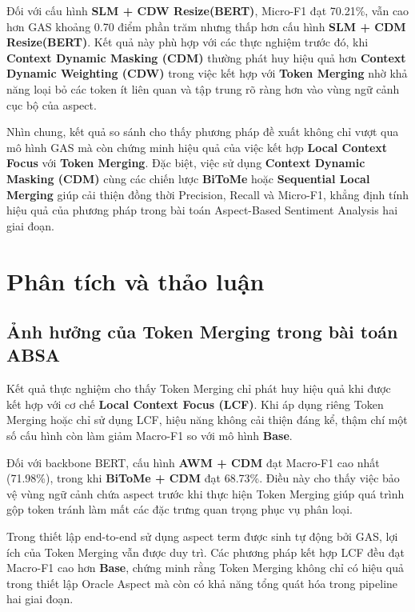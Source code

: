 Đối với cấu hình \textbf{SLM + CDW Resize(BERT)}, Micro-F1 đạt 70.21\%, vẫn cao hơn GAS khoảng 0.70 điểm phần trăm nhưng thấp hơn cấu hình \textbf{SLM + CDM Resize(BERT)}. Kết quả này phù hợp với các thực nghiệm trước đó, khi \textbf{Context Dynamic Masking (CDM)} thường phát huy hiệu quả hơn \textbf{Context Dynamic Weighting (CDW)} trong việc kết hợp với \textbf{Token Merging} nhờ khả năng loại bỏ các token ít liên quan và tập trung rõ ràng hơn vào vùng ngữ cảnh cục bộ của aspect.

Nhìn chung, kết quả so sánh cho thấy phương pháp đề xuất không chỉ vượt qua mô hình GAS mà còn chứng minh hiệu quả của việc kết hợp \textbf{Local Context Focus} với \textbf{Token Merging}. Đặc biệt, việc sử dụng \textbf{Context Dynamic Masking (CDM)} cùng các chiến lược \textbf{BiToMe} hoặc \textbf{Sequential Local Merging} giúp cải thiện đồng thời Precision, Recall và Micro-F1, khẳng định tính hiệu quả của phương pháp trong bài toán Aspect-Based Sentiment Analysis hai giai đoạn.

\section{Phân tích và thảo luận}
\label{sec:discussion}

\subsection{Ảnh hưởng của Token Merging trong bài toán ABSA}

Kết quả thực nghiệm cho thấy Token Merging chỉ phát huy hiệu quả khi
được kết hợp với cơ chế \textbf{Local Context Focus (LCF)}. Khi áp dụng riêng
Token Merging hoặc chỉ sử dụng LCF, hiệu năng không cải thiện đáng kể,
thậm chí một số cấu hình còn làm giảm Macro-F1 so với mô hình
\textbf{Base}.

Đối với backbone BERT, cấu hình \textbf{AWM + CDM} đạt Macro-F1 cao nhất (71.98\%), trong khi
\textbf{BiToMe + CDM} đạt 68.73\%.
Điều này cho thấy việc bảo vệ vùng ngữ cảnh chứa aspect trước khi thực
hiện Token Merging giúp quá trình gộp token tránh làm mất các đặc trưng
quan trọng phục vụ phân loại.

Trong thiết lập end-to-end sử dụng aspect term được sinh tự động bởi
GAS, lợi ích của Token Merging vẫn được duy trì. Các phương pháp kết
hợp LCF đều đạt Macro-F1 cao hơn \textbf{Base}, chứng minh rằng Token
Merging không chỉ có hiệu quả trong thiết lập Oracle Aspect mà còn có
khả năng tổng quát hóa trong pipeline hai giai đoạn.

